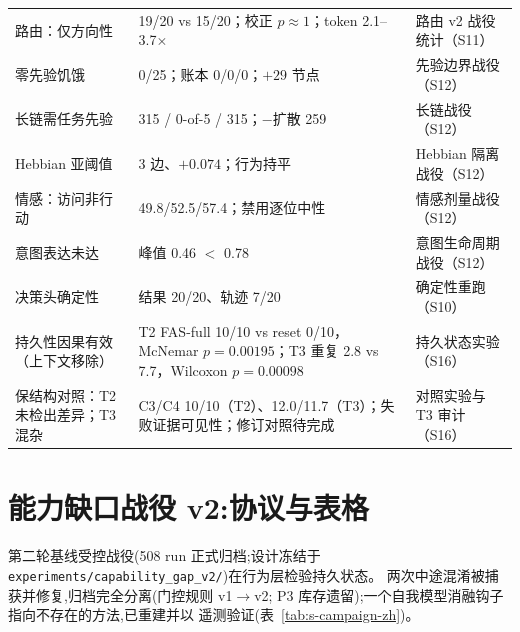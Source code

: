 \documentclass[10pt,a4paper]{ctexart}
\begin{document}
\begin{table}[h]
\begin{tabular}{L{4.6cm}L{4.6cm}L{5.6cm}}
路由：仅方向性 & 19/20 vs 15/20；校正 $p{\approx}1$；token 2.1--3.7$\times$ & 路由 v2 战役统计（S11） \\
零先验饥饿 & 0/25；账本 0/0/0；$+29$ 节点 & 先验边界战役（S12） \\
长链需任务先验 & 315 / 0-of-5 / 315；$-$扩散 259 & 长链战役（S12） \\
Hebbian 亚阈值 & 3 边、$+0.074$；行为持平 & Hebbian 隔离战役（S12） \\
情感：访问非行动 & 49.8/52.5/57.4；禁用逐位中性 & 情感剂量战役（S12） \\
意图表达未达 & 峰值 0.46 $<$ 0.78 & 意图生命周期战役（S12） \\
决策头确定性 & 结果 20/20、轨迹 7/20 & 确定性重跑（S10） \\
持久性因果有效（上下文移除） & T2 FAS-full 10/10 vs reset 0/10，McNemar $p{=}0.00195$；T3 重复 2.8 vs 7.7，Wilcoxon $p{=}0.00098$ & 持久状态实验（S16） \\
保结构对照：T2 未检出差异；T3 混杂 & C3/C4 10/10（T2）、12.0/11.7（T3）；失败证据可见性；修订对照待完成 & 对照实验与 T3 审计（S16） \\
\bottomrule
\end{tabular}
\end{table}


\section{能力缺口战役 v2:协议与表格}
\label{s15:campaign}

第二轮基线受控战役(508 run 正式归档;设计冻结于
\texttt{experiments/capability\_gap\_v2/})在行为层检验持久状态。
两次中途混淆被捕获并修复,归档完全分离(门控规则 v1$\rightarrow$v2;
P3 库存遗留);一个自我模型消融钩子指向不存在的方法,已重建并以
遥测验证(表~\ref{tab:s-campaign-zh})。
\end{document}

